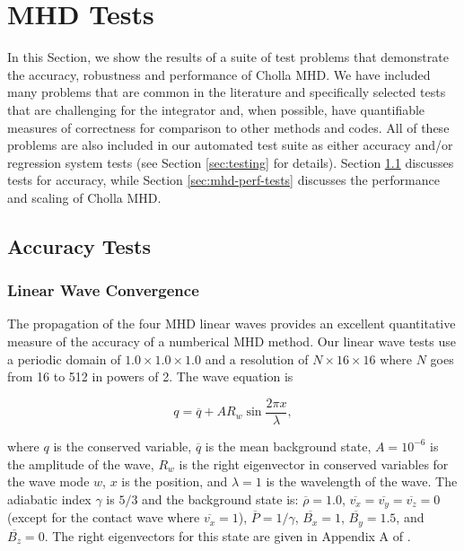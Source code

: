 \section{MHD Tests}
\label{sec:mhd-tests}

In this Section, we show the results of a suite of test problems that demonstrate the accuracy, robustness and performance of Cholla MHD. We have included many problems that are common in the literature and specifically selected tests that are challenging for the integrator and, when possible, have quantifiable measures of correctness for comparison to other methods and codes. All of these problems are also included in our automated test suite as either accuracy and/or regression system tests (see Section \ref{sec:testing} for details). Section \ref{sec:accuracy_tests} discusses tests for accuracy, while Section \ref{sec:mhd-perf-tests} discusses the performance and scaling of Cholla MHD.

\subsection{Accuracy Tests}
\label{sec:accuracy_tests}

\subsubsection{Linear Wave Convergence}
\label{sec:lwc}

The propagation of the four MHD linear waves provides an excellent quantitative measure of the accuracy of a numberical MHD method. Our linear wave tests use a periodic domain of $1.0\times1.0\times1.0$ and a resolution of $N\times16\times16$ where $N$ goes from 16 to 512 in powers of 2. The wave equation is

\begin{equation}
    q = \overline{q} + A R_w \sin{\frac{2\pi x}{\lambda}},
\end{equation}

\noindent where $q$ is the conserved variable, $\overline{q}$ is the mean background state, $A=10^{-6}$ is the amplitude of the wave, $R_w$ is the right eigenvector in conserved variables for the wave mode $w$, $x$ is the position, and $\lambda=1$ is the wavelength of the wave. The adiabatic index $\gamma$ is $5/3$ and the background state is: 
$\overline{\rho}=1.0$,
$\overline{v_x}=\overline{v_y}=\overline{v_z}=0$ (except for the contact wave where $\overline{v_x} = 1$),
$\overline{P}=1/\gamma$,
$\overline{B_x}=1$,
$\overline{B_y}=1.5$,
and $\overline{B_z}=0$.
The right eigenvectors for this state are given in Appendix A of \cite{gardiner_unsplit_2008}. 

